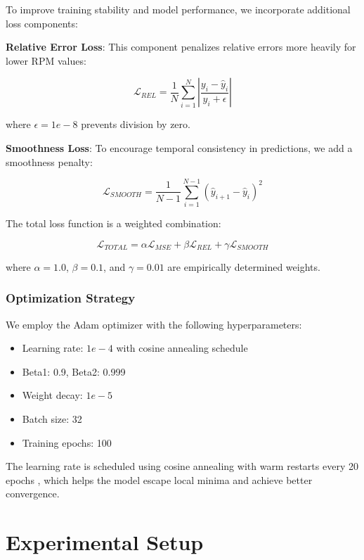 \documentclass[journal,10pt]{IEEEtran}
\begin{document}
To improve training stability and model performance, we incorporate additional loss components:

\textbf{Relative Error Loss}: This component penalizes relative errors more heavily for lower RPM values:

\begin{equation}
\mathcal{L}_{REL} = \frac{1}{N} \sum_{i=1}^{N} \left|\frac{y_i - \hat{y}_i}{y_i + \epsilon}\right|
\end{equation}

where $\epsilon = 1e-8$ prevents division by zero.

\textbf{Smoothness Loss}: To encourage temporal consistency in predictions, we add a smoothness penalty:

\begin{equation}
\mathcal{L}_{SMOOTH} = \frac{1}{N-1} \sum_{i=1}^{N-1} (\hat{y}_{i+1} - \hat{y}_i)^2
\end{equation}

The total loss function is a weighted combination:

\begin{equation}
\mathcal{L}_{TOTAL} = \alpha \mathcal{L}_{MSE} + \beta \mathcal{L}_{REL} + \gamma \mathcal{L}_{SMOOTH}
\end{equation}

where $\alpha = 1.0$, $\beta = 0.1$, and $\gamma = 0.01$ are empirically determined weights.

\subsubsection{Optimization Strategy}

We employ the Adam optimizer \cite{NN} with the following hyperparameters:
\begin{itemize}
    \item Learning rate: $1e-4$ with cosine annealing schedule
    \item Beta1: 0.9, Beta2: 0.999
    \item Weight decay: $1e-5$
    \item Batch size: 32
    \item Training epochs: 100
\end{itemize}

The learning rate is scheduled using cosine annealing with warm restarts every 20 epochs \cite{WGANGP}, which helps the model escape local minima and achieve better convergence.

\section{Experimental Setup}
\end{document}
